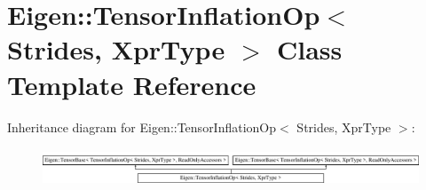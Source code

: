 \hypertarget{class_eigen_1_1_tensor_inflation_op}{}\section{Eigen\+:\+:Tensor\+Inflation\+Op$<$ Strides, Xpr\+Type $>$ Class Template Reference}
\label{class_eigen_1_1_tensor_inflation_op}
Inheritance diagram for Eigen\+:\+:Tensor\+Inflation\+Op$<$ Strides, Xpr\+Type $>$\+:\begin{figure}[H]
\begin{center}
\leavevmode
\includegraphics[height=1.131313cm]{class_eigen_1_1_tensor_inflation_op}
\end{center}
\end{figure}
